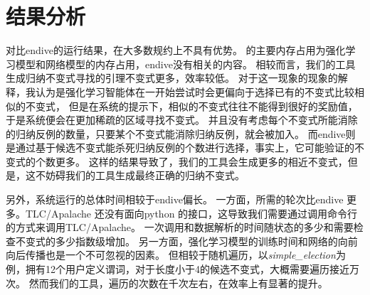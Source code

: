 \section{结果分析}
对比endive的运行结果，在大多数规约上\rltla 不具有优势。
\rltla 的主要内存占用为强化学习模型和网络模型的内存占用，endive没有相关的内容。
相较而言，我们的工具生成归纳不变式寻找的引理不变式更多，效率较低。
对于这一现象的现象的解释，我认为是强化学习智能体在一开始尝试时会更偏向于选择已有的不变式比较相似的不变式，
但是在系统的提示下，相似的不变式往往不能得到很好的奖励值，于是系统便会在更加稀疏的区域寻找不变式。
并且没有考虑每个不变式所能消除的归纳反例的数量，只要某个不变式能消除归纳反例，就会被加入。
而endive则是通过基于候选不变式能杀死归纳反例的个数进行选择，事实上，它可能验证的不变式的个数更多。
这样的结果导致了，我们的工具会生成更多的相近不变式，但是，这不妨碍我们的工具生成最终正确的归纳不变式。

另外，系统运行的总体时间相较于endive偏长。
一方面，\rltla 所需的轮次比endive 更多。TLC/Apalache 还没有面向python 的接口，这导致我们需要通过调用命令行的方式来调用TLC/Apalache。
一次调用和数据解析的时间随状态的多少和需要检查不变式的多少指数级增加。
另一方面，强化学习模型的训练时间和网络的向前向后传播也是一个不可忽视的因素。
但相较于随机遍历，以\textit{simple\_election}为例，拥有12个用户定义谓词，对于长度小于4的候选不变式，大概需要遍历接近万次。
然而我们的工具，遍历的次数在千次左右，在效率上有显著的提升。

